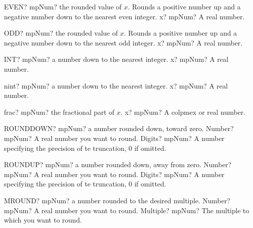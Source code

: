 \documentclass[12pt,a4paper,openany]{book}
\begin{document}
\begin{mpFunctionsExtract}
\mpWorksheetFunctionOneNotImplemented
{EVEN? mpNum? the rounded value of $x$. Rounds a positive number up and a negative number down to the nearest even integer.}
{x? mpNum? A real number.}
\end{mpFunctionsExtract}

\begin{mpFunctionsExtract}
\mpWorksheetFunctionOneNotImplemented
{ODD? mpNum? the rounded value of $x$. Rounds a positive number up and a negative number down to the nearest odd integer.}
{x? mpNum? A real number.}
\end{mpFunctionsExtract}

\begin{mpFunctionsExtract}
\mpWorksheetFunctionOneNotImplemented
{INT? mpNum?  a number down to the nearest integer.}
{x? mpNum? A real number.}
\end{mpFunctionsExtract}

\begin{mpFunctionsExtract}
\mpFunctionOne
{nint? mpNum?  a number down to the nearest integer.}
{x? mpNum? A real number.}
\end{mpFunctionsExtract}

\begin{mpFunctionsExtract}
\mpFunctionOne
{frac? mpNum? the fractional part of $x$.}
{x? mpNum? A colpmex or real number.}
\end{mpFunctionsExtract}

\begin{mpFunctionsExtract}
\mpWorksheetFunctionTwoNotImplemented
{ROUNDDOWN? mpNum? a number rounded down, toward zero.}
{Number? mpNum? A real number you want to round.}
{Digits? mpNum? A number specifying the precision of te truncation, 0 if omitted.}
\end{mpFunctionsExtract}

\begin{mpFunctionsExtract}
\mpWorksheetFunctionTwoNotImplemented
{ROUNDUP? mpNum? a number rounded down, away from zero.}
{Number? mpNum? A real number you want to round.}
{Digits? mpNum? A number specifying the precision of te truncation, 0 if omitted.}
\end{mpFunctionsExtract}

\begin{mpFunctionsExtract}
\mpWorksheetFunctionTwoNotImplemented
{MROUND? mpNum? a number rounded to the desired multiple.}
{Number? mpNum? A real number you want to round.}
{Multiple? mpNum? The multiple to which you want to round.}
\end{mpFunctionsExtract}
\end{document}

